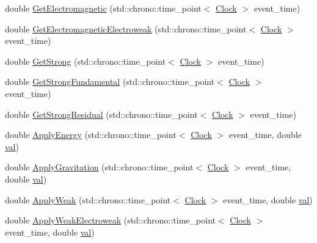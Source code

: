 \begin{DoxyCompactItemize}
\item 
double \mbox{\hyperlink{class_elementary_force_a2c8bc3226f42710717775c73eee1644e}{Get\+Electromagnetic}} (std\+::chrono\+::time\+\_\+point$<$ \mbox{\hyperlink{universe_8h_a0ef8d951d1ca5ab3cfaf7ab4c7a6fd80}{Clock}} $>$ event\+\_\+time)
\item 
double \mbox{\hyperlink{class_elementary_force_a58e503f2f3a7410f034a2a04bca560d1}{Get\+Electromagnetic\+Electroweak}} (std\+::chrono\+::time\+\_\+point$<$ \mbox{\hyperlink{universe_8h_a0ef8d951d1ca5ab3cfaf7ab4c7a6fd80}{Clock}} $>$ event\+\_\+time)
\item 
double \mbox{\hyperlink{class_elementary_force_aaa1cde27b1508831f67353eb39745a7e}{Get\+Strong}} (std\+::chrono\+::time\+\_\+point$<$ \mbox{\hyperlink{universe_8h_a0ef8d951d1ca5ab3cfaf7ab4c7a6fd80}{Clock}} $>$ event\+\_\+time)
\item 
double \mbox{\hyperlink{class_elementary_force_a0974d6537c07dac2453d2a607324fa21}{Get\+Strong\+Fundamental}} (std\+::chrono\+::time\+\_\+point$<$ \mbox{\hyperlink{universe_8h_a0ef8d951d1ca5ab3cfaf7ab4c7a6fd80}{Clock}} $>$ event\+\_\+time)
\item 
double \mbox{\hyperlink{class_elementary_force_a3478c8ad35bce240055da7d4a03e555e}{Get\+Strong\+Residual}} (std\+::chrono\+::time\+\_\+point$<$ \mbox{\hyperlink{universe_8h_a0ef8d951d1ca5ab3cfaf7ab4c7a6fd80}{Clock}} $>$ event\+\_\+time)
\item 
double \mbox{\hyperlink{class_elementary_force_a0961328b260cb4dfb2ba54f4e284f0e8}{Apply\+Energy}} (std\+::chrono\+::time\+\_\+point$<$ \mbox{\hyperlink{universe_8h_a0ef8d951d1ca5ab3cfaf7ab4c7a6fd80}{Clock}} $>$ event\+\_\+time, double \mbox{\hyperlink{glad_8h_a26942fd2ed566ef553eae82d2c109c8f}{val}})
\item 
double \mbox{\hyperlink{class_elementary_force_a655a2c9489bfbbf15e05ba4953628134}{Apply\+Gravitation}} (std\+::chrono\+::time\+\_\+point$<$ \mbox{\hyperlink{universe_8h_a0ef8d951d1ca5ab3cfaf7ab4c7a6fd80}{Clock}} $>$ event\+\_\+time, double \mbox{\hyperlink{glad_8h_a26942fd2ed566ef553eae82d2c109c8f}{val}})
\item 
double \mbox{\hyperlink{class_elementary_force_aabf66a859e6e808a65c6929cd16f7597}{Apply\+Weak}} (std\+::chrono\+::time\+\_\+point$<$ \mbox{\hyperlink{universe_8h_a0ef8d951d1ca5ab3cfaf7ab4c7a6fd80}{Clock}} $>$ event\+\_\+time, double \mbox{\hyperlink{glad_8h_a26942fd2ed566ef553eae82d2c109c8f}{val}})
\item 
double \mbox{\hyperlink{class_elementary_force_a2d3a5444c771f35d66d4151c62f53b12}{Apply\+Weak\+Electroweak}} (std\+::chrono\+::time\+\_\+point$<$ \mbox{\hyperlink{universe_8h_a0ef8d951d1ca5ab3cfaf7ab4c7a6fd80}{Clock}} $>$ event\+\_\+time, double \mbox{\hyperlink{glad_8h_a26942fd2ed566ef553eae82d2c109c8f}{val}})

\end{DoxyCompactItemize}
